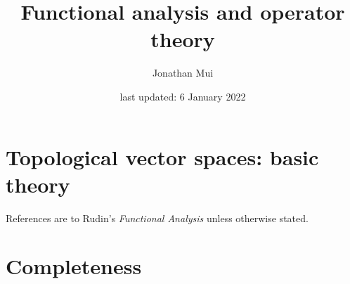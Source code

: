 \documentclass[11pt]{article}
\title{Functional analysis and operator theory}
\author{Jonathan Mui}
\date{last updated: 6 January 2022}
\begin{document}
	
	\maketitle
	
	\section{Topological vector spaces: basic theory}
	References are to Rudin's \emph{Functional Analysis} unless otherwise stated.
	
	
	\section{Completeness}
	
	
\end{document}

